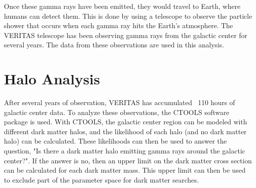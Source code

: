   Once these gamma rays have been emitted, they would travel to Earth, where humans can detect them.
  This is done by using a telescope to observe the particle shower that occurs when each gamma ray hits the Earth's atmosphere.
  The VERITAS telescope has been observing gamma rays from the galactic center for several years.
  The data from these observations are used in this analysis.


\section{Halo Analysis}
  After several years of observation, VERITAS has accumulated ~110 hours of galactic center data.
  To analyze these observations, the CTOOLS software package \cite{gammalibctools} is used.
  With CTOOLS, the galactic center region can be modeled with different dark matter halos, and the likelihood of each halo (and no dark matter halo) can be calculated.
  These likelihoods can then be used to answer the question, "Is there a dark matter halo emitting gamma rays around the galactic center?".
  If the answer is no, then an upper limit on the dark matter cross section can be calculated for each dark matter mass.
  This upper limit can then be used to exclude part of the parameter space for dark matter searches.


